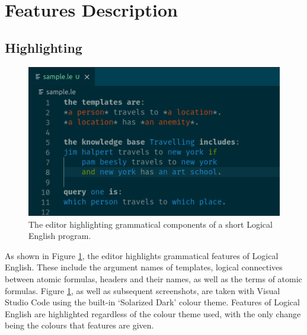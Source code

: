 \documentclass[../main.tex]{subfiles}
\begin{document}
\section{Features Description}
\subsection{Highlighting}
\begin{figure}[h!]
\centering
\includegraphics[width = \linewidth]{./figures/highlighting.png}
\caption{The editor highlighting grammatical components of a short Logical English program.}
\label{fig:highlighting}
\end{figure}
As shown in Figure \ref{fig:highlighting}, the editor highlights grammatical features of Logical English. These include the argument names of templates, logical connectives between atomic formulas, headers and their names, as well as the terms of atomic formulas. Figure \ref{fig:highlighting}, as well as subsequent screenshots, are taken with Visual Studio Code using the built-in `Solarized Dark' colour theme. Features of Logical English are highlighted regardless of the colour theme used, with the only change being the colours that features are given.
\end{document}

